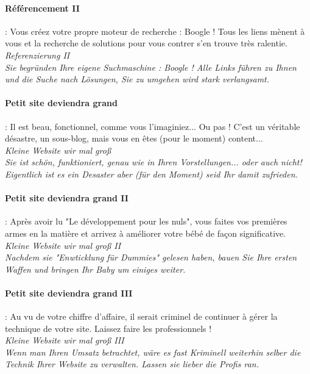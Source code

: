 \documentclass[10pt,a4paper]{article}
\begin{document}
\paragraph{Référencement II} : Vous créez votre propre moteur de recherche : Boogle ! Tous les liens mènent à vous et la recherche de solutions pour vous contrer s'en trouve très ralentie.\\
\textit{Referenzierung II}\\
\textit{Sie begründen Ihre eigene Suchmaschine : Boogle ! Alle Links führen zu Ihnen und die Suche nach Lösungen, Sie zu umgehen wird stark verlangsamt.}


\paragraph{Petit site deviendra grand }: Il est beau, fonctionnel, comme vous l'imaginiez... Ou pas ! C'est un véritable désastre, un sous-blog, mais vous en êtes (pour le moment) content...\\
\textit{Kleine Website wir mal groß}\\
\textit{Sie ist schön, funktioniert, genau wie in Ihren Vorstellungen... oder auch nicht! Eigentlich ist es ein Desaster aber (für den Moment) seid Ihr damit zufrieden.}


\paragraph{Petit site deviendra grand II} : Après avoir lu "Le développement pour les nuls", vous faites vos premières armes en la matière et arrivez à améliorer votre bébé de façon significative.\\
\textit{Kleine Website wir mal groß II}\\
\textit{Nachdem sie "Enwticklung für Dummies" gelesen haben, bauen Sie Ihre ersten Waffen und bringen Ihr Baby um einiges weiter.}


\paragraph{Petit site deviendra grand III} : Au vu de votre chiffre d'affaire, il serait criminel de continuer à gérer la technique de votre site. Laissez faire les professionnels !\\
\textit{Kleine Website wir mal groß III}\\
\textit{Wenn man Ihren Umsatz betrachtet, wäre es fast Kriminell weiterhin selber die Technik Ihrer Website zu verwalten. Lassen sie lieber die Profis ran.}
\end{document}
